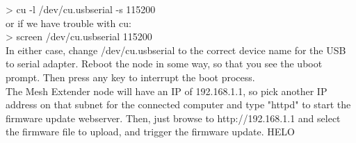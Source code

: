 > cu -l /dev/cu.usbserial -s 115200\\

or if we have trouble with cu: \\ 

> screen /dev/cu.usbserial 115200 \\

In either case, change /dev/cu.usbserial to the correct device name for the USB to serial adapter. Reboot the node in some way, so that you see the uboot prompt. Then press any key to interrupt the boot process.\\
The Mesh Extender node will have an IP of 192.168.1.1, so pick another IP address on that subnet for the connected computer and type "httpd" to start the firmware update webserver. Then, just browse to http://192.168.1.1 and select the firmware file to upload, and trigger the firmware update.  HELO
